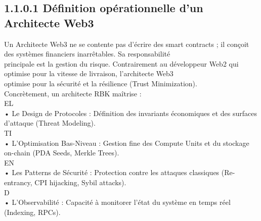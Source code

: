 \subsection{1.1.0.1 Définition opérationnelle d’un Architecte Web3}
\vspace{0.5em}
Un Architecte Web3 ne se contente pas d’écrire des smart contracts ; il conçoit des systèmes financiers inarrêtables. Sa responsabilité\\
principale est la gestion du risque. Contrairement au développeur Web2 qui optimise pour la vitesse de livraison, l’architecte Web3\\
optimise pour la sécurité et la résilience (Trust Minimization).\\
Concrètement, un architecte RBK maîtrise :\\
\vspace{0.5em}
\vspace{0.5em}
\vspace{0.5em}
\vspace{0.5em}
EL\\
• Le Design de Protocoles : Définition des invariants économiques et des surfaces d’attaque (Threat Modeling).\\
\vspace{0.5em}
\vspace{0.5em}
\vspace{0.5em}
\vspace{0.5em}
TI\\
• L’Optimisation Bas-Niveau : Gestion fine des Compute Units et du stockage on-chain (PDA Seeds, Merkle Trees).\\
\vspace{0.5em}
\vspace{0.5em}
\vspace{0.5em}
\vspace{0.5em}
EN\\
• Les Patterns de Sécurité : Protection contre les attaques classiques (Re-entrancy, CPI hijacking, Sybil attacks).\\
\vspace{0.5em}
\vspace{0.5em}
\vspace{0.5em}
\vspace{0.5em}
D\\
• L’Observabilité : Capacité à monitorer l’état du système en temps réel (Indexing, RPCs).\\
\vspace{0.5em}
\vspace{0.5em}
\vspace{0.5em}
